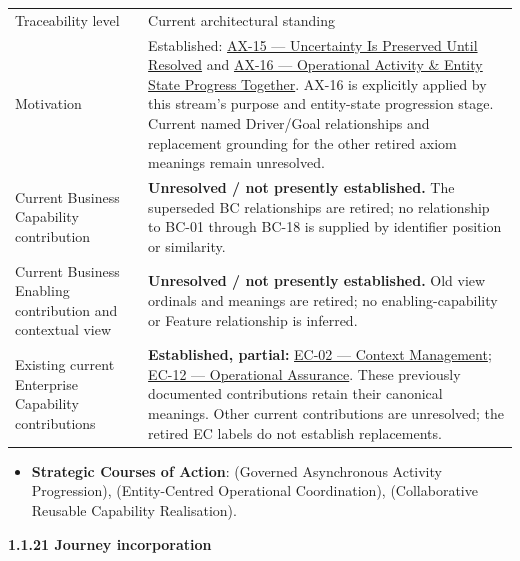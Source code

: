 \begin{longtable}{>{\raggedright\arraybackslash}p{}>{\raggedright\arraybackslash}p{}}
Traceability level & Current architectural standing \\
Motivation & Established: \hyperref[element:ef8abbaec37e4890ad78b9f263e67906]{AX-15 — Uncertainty Is Preserved Until Resolved} and \hyperref[element:de7e90f46127455a9ec9ad3b9b48ba54]{AX-16 — Operational Activity \& Entity State Progress Together}. AX-16 is explicitly applied by this stream’s purpose and entity-state progression stage. Current named Driver/Goal relationships and replacement grounding for the other retired axiom meanings remain unresolved. \\
Current Business Capability contribution & \textbf{Unresolved / not presently established.} The superseded BC relationships are retired; no relationship to BC-01 through BC-18 is supplied by identifier position or similarity. \\
Current Business Enabling contribution and contextual view & \textbf{Unresolved / not presently established.} Old view ordinals and meanings are retired; no enabling-capability or Feature relationship is inferred. \\
Existing current Enterprise Capability contributions & \textbf{Established, partial:} \href{\detokenize{../../../../../../../../docs/markdown/02-strategy/capabilities/enterprise-capabilities.md#ec-02-context-management}}{EC-02 — Context Management}; \href{\detokenize{../../../../../../../../docs/markdown/02-strategy/capabilities/enterprise-capabilities.md#ec-12-operational-assurance}}{EC-12 — Operational Assurance}. These previously documented contributions retain their canonical meanings. Other current contributions are unresolved; the retired EC labels do not establish replacements. \\
\end{longtable}


\begin{itemize}


\item \textbf{Strategic Courses of Action}: \texttt{} (Governed Asynchronous Activity Progression), \texttt{} (Entity-Centred Operational Coordination), \texttt{} (Collaborative Reusable Capability Realisation).

\end{itemize}


\par\medskip\textbf{1.1.21 Journey incorporation}\par


